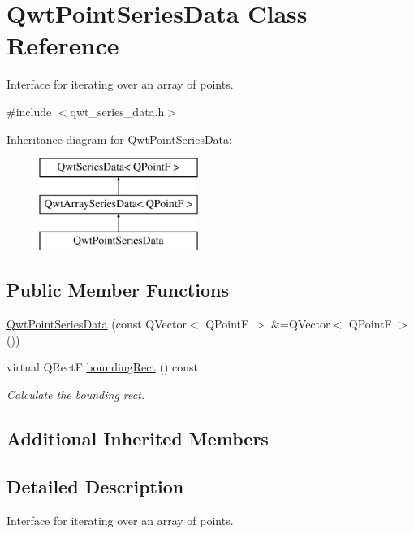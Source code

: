 \hypertarget{class_qwt_point_series_data}{\section{Qwt\-Point\-Series\-Data Class Reference}
\label{class_qwt_point_series_data}
}


Interface for iterating over an array of points.  




{\ttfamily \#include $<$qwt\-\_\-series\-\_\-data.\-h$>$}

Inheritance diagram for Qwt\-Point\-Series\-Data\-:\begin{figure}[H]
\begin{center}
\leavevmode
\includegraphics[height=3.000000cm]{class_qwt_point_series_data}
\end{center}
\end{figure}
\subsection*{Public Member Functions}
\begin{DoxyCompactItemize}
\item 
\hyperlink{class_qwt_point_series_data_aee91c50c88699839f7f5e720a23b9d3a}{Qwt\-Point\-Series\-Data} (const Q\-Vector$<$ Q\-Point\-F $>$ \&=Q\-Vector$<$ Q\-Point\-F $>$())
\item 
virtual Q\-Rect\-F \hyperlink{class_qwt_point_series_data_ad5cf93cd9f518be6b0d910982cabd96d}{bounding\-Rect} () const 
\begin{DoxyCompactList}\small\item\em Calculate the bounding rect. \end{DoxyCompactList}\end{DoxyCompactItemize}
\subsection*{Additional Inherited Members}


\subsection{Detailed Description}
Interface for iterating over an array of points. 

